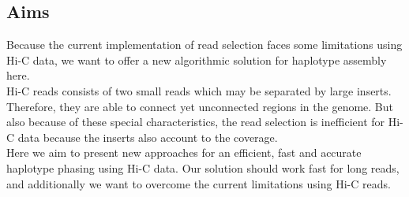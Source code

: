 \subsection{Aims}
\label{Aims}
Because the current implementation of read selection faces some limitations using Hi-C data, we want to offer a new algorithmic solution for haplotype assembly here.\\
Hi-C reads consists of two small reads which may be separated by large inserts. Therefore, they are able to connect yet unconnected regions in the genome. But also because of these special characteristics, the read selection is inefficient for Hi-C data because the inserts also account to the coverage.\\
Here we aim to present new approaches for an efficient, fast and accurate haplotype phasing using Hi-C data. Our solution should work fast for long reads, and additionally we want to overcome the current limitations using Hi-C reads.